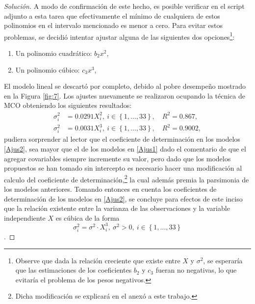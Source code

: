 \documentclass[10.5pt,notitlepage]{article}
\newenvironment{solucion}
  {\begin{proof}[Solución]}
  {\end{proof}}
\newcommand{\kis}[1]{\left\{ #1 \right\}}
\theoremstyle{plain}
\begin{document}
\begin{solucion}
A modo de confirmación de este hecho, es posible verificar en el script adjunto a esta tarea que efectivamente el mínimo de cualquiera de estos polinomios en el intervalo mencionado es menor a cero. Para evitar estos problemas, se decidió intentar ajustar alguna de las siguientes dos opciones\footnote{Observe que dada la relación creciente que existe entre \(X\) y \(\sigma^2\), se esperaría que las estimaciones de los coeficientes \(b_2\) y \(c_3\) fueran no negativas, lo que evitaría el problema de los pesos negativos.}:
\begin{enumerate}
    \item Un polinomio cuadrático: \(b_2 x^2\), 
    \item Un polinomio cúbico: \(c_3 x^3\),
\end{enumerate}
El modelo lineal se descartó por completo, debido al pobre desempeño mostrado en la Figura \ref{fig:7}. Los ajustes nuevamente se realizaron ocupando la técnica de MCO obteniendo los siguientes resultados: 
\begin{align}\label{Ajus2}
     \sigma_i^{2} &=  0.0291X_i^{2}, \ i\in\kis{1, \hdots, 33}, \quad R^2 =0.867,\nonumber \\ 
     \sigma_i^{2} &=  0.0031X_{i}^{3}, \ i\in\kis{1, \hdots, 33}, \quad R^2 =0.9002,
\end{align}
pudiera sorprender al lector que el coeficiente de determinación en los modelos \eqref{Ajus2}, sea mayor que el de los modelos en \eqref{Ajus1} dado el comentario de que el agregar covariables siempre incremente su valor, pero dado que los modelos propuestos se han tomado sin intercepto es necesario hacer una modificación al calculo del coeficiente de determinación,\footnote{Dicha modificación se explicará en el anexó a este trabajo.} la cual además premia la parsimonia de los modelos anteriores. Tomando entonces en cuenta los coeficientes de determinación de los modelos en \eqref{Ajus2}, se concluye para efectos de este inciso que la relación existente entre la varianza de las observaciones y la variable independiente \(X\) es cúbica de la forma
\begin{equation}\label{Var}
     \sigma_i^{2} = \sigma^2 \cdot X_{i}^{3}, \ \sigma^2 >0, \ i\in\kis{1, \hdots, 33}
\end{equation}.


\end{solucion}
\end{document}
